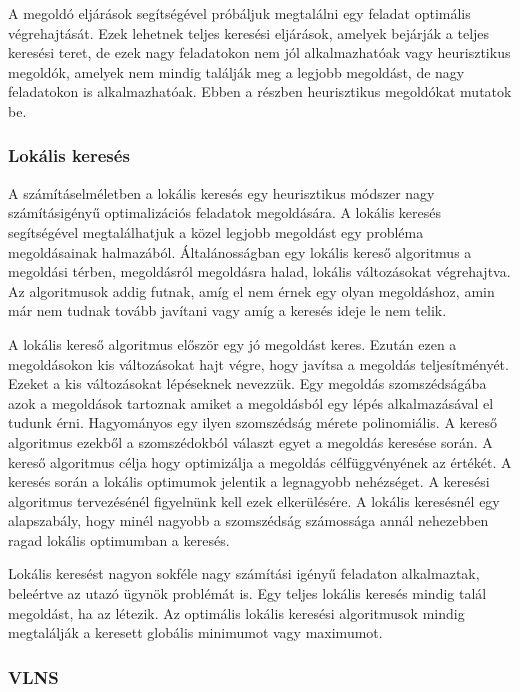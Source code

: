 A megoldó eljárások segítségével próbáljuk megtalálni egy feladat optimális végrehajtását. Ezek lehetnek teljes keresési eljárások, amelyek bejárják a teljes keresési teret, de ezek nagy feladatokon nem jól alkalmazhatóak vagy heurisztikus megoldók, amelyek nem mindig találják meg a legjobb megoldást, de nagy feladatokon is alkalmazhatóak. Ebben a részben heurisztikus megoldókat mutatok be. 

\subsubsection{Lokális keresés}

A számításelméletben a lokális keresés egy heurisztikus módszer nagy számításigényű optimalizációs feladatok megoldására. A lokális keresés segítségével megtalálhatjuk a közel legjobb megoldást egy probléma megoldásainak halmazából. Általánosságban egy lokális kereső algoritmus a megoldási térben, megoldásról megoldásra halad, lokális változásokat végrehajtva. Az algoritmusok addig futnak, amíg el nem érnek egy olyan megoldáshoz, amin már nem tudnak tovább javítani vagy amíg a keresés ideje le nem telik.

A lokális kereső algoritmus először egy jó megoldást keres. Ezután ezen a megoldásokon kis változásokat hajt végre, hogy javítsa a megoldás teljesítményét. Ezeket a kis változásokat lépéseknek nevezzük. Egy megoldás szomszédságába azok a megoldások tartoznak amiket a megoldásból egy lépés alkalmazásával el tudunk érni. Hagyományos egy ilyen szomszédság mérete polinomiális. A kereső algoritmus ezekből a szomszédokból választ egyet a megoldás keresése során. A kereső algoritmus célja hogy optimizálja a megoldás célfüggvényének az értékét. A keresés során a lokális optimumok jelentik a legnagyobb nehézséget. A keresési algoritmus tervezésénél figyelnünk kell ezek elkerülésére. A lokális keresésnél egy alapszabály, hogy minél nagyobb a szomszédság számossága annál nehezebben ragad lokális optimumban a keresés.

Lokális keresést nagyon sokféle nagy számítási igényű feladaton alkalmaztak, beleértve az utazó ügynök problémát is. Egy teljes lokális keresés mindig talál megoldást, ha az létezik. Az optimális lokális keresési algoritmusok mindig megtalálják a keresett globális minimumot vagy maximumot.

\cite{Mouthuy:2012}
\cite{russel:2003}

\subsubsection{VLNS}

